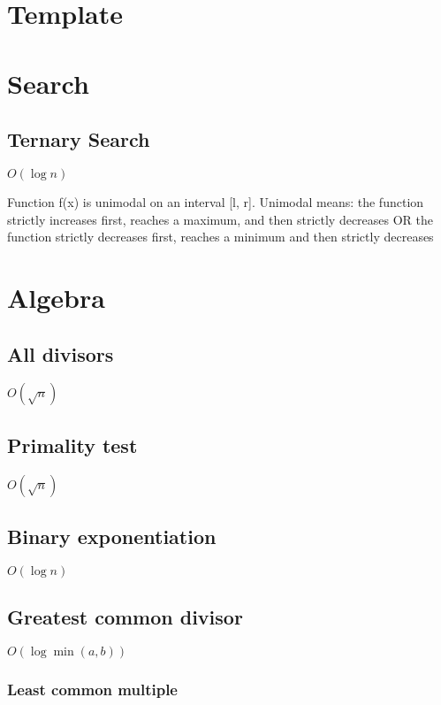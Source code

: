 \documentclass{article}
\begin{document}
\tableofcontents 

\section{Template}


\section{Search}
\subsection{Ternary Search}
$O(\log{n})$

Function f(x) is unimodal on an interval [l, r]. Unimodal means: the function strictly increases first, reaches a maximum, and then strictly decreases OR the function strictly decreases first, reaches a minimum and then strictly decreases

\section{Algebra}
\subsection{All divisors}
$O(\sqrt{n})$


\subsection{Primality test}
$O(\sqrt{n})$


\subsection{Binary exponentiation}
$O(\log n)$


\subsection{Greatest common divisor}
$O(\log \min (a, b))$

\subsubsection{Least common multiple}

\end{document}
